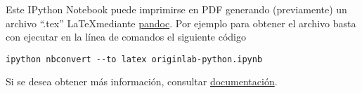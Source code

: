 \documentclass{article}
\begin{document}
    Este IPython Notebook puede imprimirse en PDF generando (previamente) un
archivo ``.tex'' \LaTeX mediante
\href{http://johnmacfarlane.net/pandoc/}{pandoc}. Por ejemplo para
obtener el archivo basta con ejecutar en la línea de comandos el
siguiente código

\texttt{ipython nbconvert -{}-to latex originlab-python.ipynb}

Si se desea obtener más información, consultar
\href{http://ipython.org/ipython-doc/stable/notebook/nbconvert.html}{documentación}.


    
    
    
    
\end{document}
